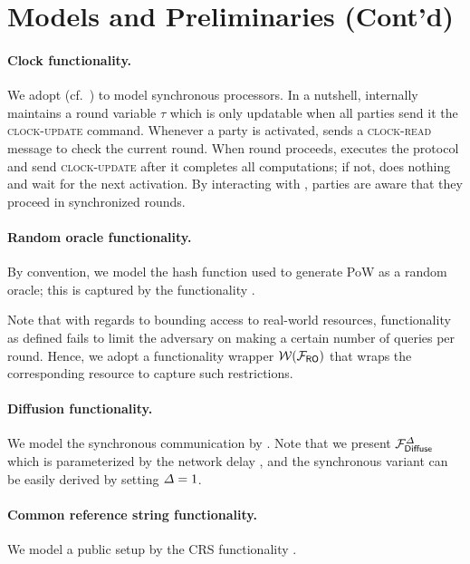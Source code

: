 \section{Models and Preliminaries (Cont'd)}
\label{sec:model-preliminaries-contd}

\paragraph{Clock functionality.}
%
We adopt \funcClock (cf.~\cite{TCC:KMTZ13}) to model synchronous processors.
%
In a nutshell, \funcClock internally maintains a round variable $\tau$ which is only updatable when all parties send it the \textsc{clock-update} command.
%
Whenever a party \party is activated, \party sends a \textsc{clock-read} message to check the current round.
%
When round proceeds, \party executes the protocol and send \textsc{clock-update} after it completes all computations; if not, \party does nothing and wait for the next activation.
%
By interacting with \funcClock, parties are aware that they proceed in synchronized rounds.



\paragraph{Random oracle functionality.}
%
By convention, we model the hash function used to generate PoW as a random oracle; this is captured by the functionality \funcRO.



Note that with regards to bounding access to real-world resources, functionality \funcRO as defined fails to limit the adversary on making a certain number of queries per round.
%
Hence, we adopt a functionality wrapper \cite{C:BMTZ17,EC:GKOPZ20} $\mathcal{W}(\mathcal{F}_{\textsf{RO}})$ that wraps the corresponding resource to capture such restrictions.



\paragraph{Diffusion functionality.}
%
We model the synchronous communication by \funcDiffuse \cite{C:BMTZ17}.
%
Note that we present $\mathcal{F}_{\textsf{Diffuse}}^\varDelta$ which is parameterized by the network delay \delay, and the synchronous variant can be easily derived by setting $\varDelta = 1$.



\paragraph{Common reference string functionality.}
%
We model a public setup by the CRS functionality \funcCRS.


